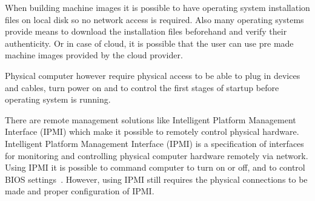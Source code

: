 When building machine images it is possible to have operating system
installation files on local disk so no network access is
required. Also many operating systems provide means to download the
installation files beforehand and verify their authenticity. Or in
case of cloud, it is possible that the user can use pre made machine
images provided by the cloud provider.

Physical computer however require physical access to be able to plug
in devices and cables, turn power on and to control the first stages
of startup before operating system is running.

There are remote management solutions like Intelligent Platform
Management Interface (IPMI) which make it possible to remotely control
physical hardware. Intelligent Platform Management Interface (IPMI) is
a specification of interfaces for monitoring and controlling physical
computer hardware remotely via network. Using IPMI it is possible to
command computer to turn on or off, and to control BIOS
settings~\cite{ipmi-spec}. However, using IPMI still requires the
physical connections to be made and proper configuration of IPMI.

